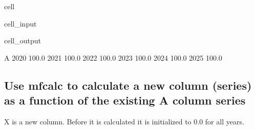 \documentclass[letterpaper,10pt,english]{jupyterBook}
\begin{document}
\begin{sphinxuseclass}{cell}\begin{sphinxVerbatimInput}

\begin{sphinxuseclass}{cell_input}
\begin{sphinxVerbatim}[commandchars=\\\{\}]
                                   
                                               
    \PYG{p}{[}    \PYG{p}{]}           
    \PYG{p}{[}\PYG{p}{]}                                  
   
\end{sphinxVerbatim}

\end{sphinxuseclass}\end{sphinxVerbatimInput}
\begin{sphinxVerbatimOutput}

\begin{sphinxuseclass}{cell_output}
\begin{sphinxVerbatim}[commandchars=\\\{\}]
          A
2020  100.0
2021  100.0
2022  100.0
2023  100.0
2024  100.0
2025  100.0
\end{sphinxVerbatim}

\end{sphinxuseclass}\end{sphinxVerbatimOutput}

\end{sphinxuseclass}

\subsection{Use  mfcalc to calculate a new column (series) as a function of the existing A column series}
\label{\detokenize{content/howto/update/extending_dataframes:use-mfcalc-to-calculate-a-new-column-series-as-a-function-of-the-existing-a-column-series}}
\sphinxAtStartPar
X is a new column. Before it is calculated it is initialized to 0.0 for all years.
\end{document}
